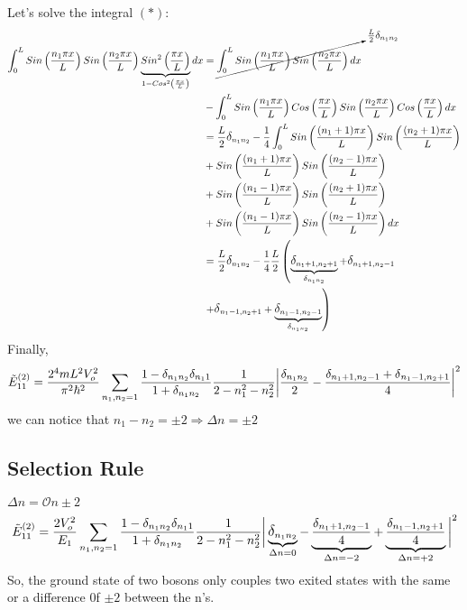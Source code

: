 \documentclass[12pt,fancychapters]{report}
\numberwithin{equation}{section}
\begin{document}
Let's solve the integral $(*)$:
\begin{align*}
\int_{0}^{L} Sin\left(\frac{n_1 \pi x}{L}\right)
	Sin\left(\frac{n_2 \pi x}{L}\right)\underbrace{Sin^2\left(\frac{\pi x}{L}\right)}
	_{1-Cos^2\left(\frac{\pi x}{L}\right)}dx &= \cancelto{\frac{L}{2}\delta_{n_1n_2}}{\int_{0}^{L}
	Sin\left(\frac{n_1 \pi x}{L}\right)Sin\left(\frac{n_2 \pi x}{L}\right)dx}\\
	& -\int_{0}^{L}Sin\left(\frac{n_1 \pi x}{L}\right) Cos\left(\frac{\pi x}{L}\right)
	Sin\left(\frac{n_2 \pi x}{L}\right) Cos\left(\frac{\pi x}{L}\right)dx\\
	&= \frac{L}{2}\mathlarger{\delta}_{n_1n_2} -\frac{1}{4}\int_{0}^{L}Sin\left(\frac{(n_1+1)\pi x}
	{L}\right)Sin\left(\frac{(n_2+1)\pi x}{L}\right)\\
	& +Sin\left(\frac{(n_1+1)\pi x}{L}\right)Sin\left(\frac{(n_2-1)\pi x}{L}\right)\\
	&+ Sin\left(\frac{(n_1 -1)\pi x}{L}\right)Sin\left(\frac{(n_2+1)\pi x}{L}\right)\\
	&+ Sin\left(\frac{(n_1-1)\pi x}{L}\right)Sin\left(\frac{(n_2-1)\pi x}{L}\right)dx\\
	&= \frac{L}{2}\mathlarger{\delta}_{n_1n_2}-\frac{1}{4}\frac{L}{2}\left(\underbrace{\mathlarger
	{\delta}_{n_1+1,n_2+1}}_{\delta_{n_1n_2}} + \mathlarger{\delta}_{n_1+1,n_2-1}\right.\\
  & \left.+\mathlarger{\delta}
_{n_1-1,n_2+1}+\underbrace{\mathlarger{\delta}_{n_1-1,n_2-1}}_{\delta_{n_1n_2}}\right)\\
\end{align*}
Finally,
\begin{equation*}
	\tilde{E}_{11}^{(2)}=\frac{2^4 mL^2 V_o^2}{\pi^2 \hbar^2} \sum_{n_1,n_2 =1}\frac{1-\mathlarger{\delta}_{n_1 n_2}
	\mathlarger{\delta}_{n_1 1}}{1+\mathlarger{\delta}_{n_1 n_2}}\frac{1}{2-n_1^2-n_2^2}\bigg|
	\frac{\mathlarger{\delta}_{n_1n_2}}{2}-\frac{\mathlarger{\delta}_{n_1+1,n_2-1}+\mathlarger{\delta}
	_{n_1-1,n_2+1}}{4}\bigg|^2
\end{equation*}
we can notice that $n_1-n_2 = \pm 2\Rightarrow \Delta n = \pm 2$

\subsection*{Selection Rule}
$\Delta n = \mathcal{O}n \pm 2$
\begin{equation*}
		\tilde{E}_{11}^{(2)}=\frac{2V_o^2}{E_1} \sum_{n_1,n_2 =1}\frac{1-\mathlarger{\delta}_{n_1 n_2}
	\mathlarger{\delta}_{n_1 1}}{1+\mathlarger{\delta}_{n_1 n_2}}\frac{1}{2-n_1^2-n_2^2}\bigg|
	\underbrace{\mathlarger{\delta}_{n_1n_2}}_{\Delta n = 0}-
	\underbrace{\frac{\mathlarger{\delta}_{n_1+1,n_2-1}}{4}}_{\Delta n = -2}+
	\underbrace{\frac{\mathlarger{\delta}_{n_1-1,n_2+1}}{4}}_{\Delta n = +2}\bigg|^2
\end{equation*}
So, the ground state of two bosons only couples two exited states with the same or a difference
0f $\pm 2$ between the n's.
\end{document}
